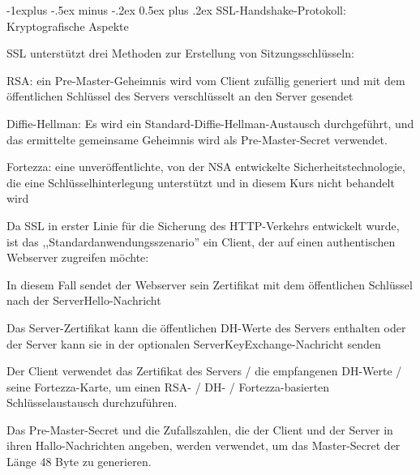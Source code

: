 \documentclass[a4paper]{article}
\makeatletter
\renewcommand{\subsection}{\@startsection{subsection}{2}{0mm}%
 {-1explus -.5ex minus -.2ex}%
 {0.5ex plus .2ex}%
 {\normalfont\normalsize\bfseries}}
\makeatother
\begin{document}
\begin{multicols}{3}
\begin{itemize*}
            \subsection{SSL-Handshake-Protokoll: Kryptografische
                  Aspekte}
            \begin{itemize*}
                  \item       SSL unterstützt drei Methoden zur Erstellung von Sitzungsschlüsseln:
                  \begin{itemize*}
                        \item RSA: ein Pre-Master-Geheimnis wird vom Client zufällig generiert und mit dem öffentlichen Schlüssel des Servers verschlüsselt an den Server gesendet
                        \item Diffie-Hellman: Es wird ein Standard-Diffie-Hellman-Austausch durchgeführt, und das ermittelte gemeinsame Geheimnis wird als Pre-Master-Secret verwendet.
                        \item Fortezza: eine unveröffentlichte, von der NSA entwickelte Sicherheitstechnologie, die eine Schlüsselhinterlegung unterstützt und in diesem Kurs nicht behandelt wird
                  \end{itemize*}
                  \item       Da SSL in erster Linie für die Sicherung des HTTP-Verkehrs entwickelt
                  wurde, ist das ,,Standardanwendungsszenario'' ein Client, der auf
                  einen authentischen Webserver zugreifen möchte:
                  \begin{itemize*}
                        \item In diesem Fall sendet der Webserver sein Zertifikat mit dem öffentlichen Schlüssel nach der ServerHello-Nachricht
                        \item Das Server-Zertifikat kann die öffentlichen DH-Werte des Servers enthalten oder der Server kann sie in der optionalen ServerKeyExchange-Nachricht senden
                        \item Der Client verwendet das Zertifikat des Servers / die empfangenen DH-Werte / seine Fortezza-Karte, um einen RSA- / DH- / Fortezza-basierten Schlüsselaustausch durchzuführen.
                  \end{itemize*}
                  \item       Das Pre-Master-Secret und die Zufallszahlen, die der Client und der
                  Server in ihren Hallo-Nachrichten angeben, werden verwendet, um das
                  Master-Secret der Länge 48 Byte zu generieren.

\end{itemize*}
\end{itemize*}
\end{multicols}
\end{document}
